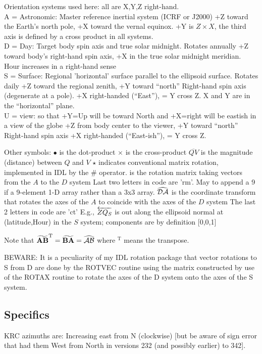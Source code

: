 \documentclass{article}
\begin{document}
\vspace{2.mm}
Orientation systems used here: all are X,Y,Z right-hand. 
\\ A = Astronomic: Master reference inertial system (ICRF or J2000) 
\qi  +Z toward the Earth's north pole, +X toward the vernal equinox.
\qii +Y is $Z \times  X $, the third axis is defined by a cross product in all systems. 
\\ D = Day: Target body spin axis and true solar midnight. Rotates annually
\qi +Z toward body's right-hand spin axis, +X in the true solar midnight meridian.
\qii Hour increases in a right-hand sense
\\ S = Surface: Regional 'horizontal' surface parallel to the ellipsoid surface. Rotates daily
\qi  +Z toward the regional zenith, +Y toward ``north'' Right-hand spin axis (degenerate at a pole).
\qii  +X right-handed (``East''), = Y cross Z. X and Y are in the ``horizontal'' plane.
\\ U = view: so that +Y=Up will be toward North and  +X=right will be eastish in a view of the globe
\qi +Z from body center to the viewer, +Y toward ``north'' Right-hand spin axis
\qi +X right-handed (``East-ish''), = Y cross Z.

\vspace{2.mm}
Other symbols:
\qi $\bullet$ is the dot-product 
\qi $\times$ is the cross-product 
\qi $\overline{QV}$ is the magnitude (distance) between $Q$ and $V$
\qi $\star$ indicates conventional matrix rotation, implemented in IDL by the \#
 operator.
\qi {} is the rotation matrix taking vectors from the $A$ to the $D$ system
\qii Last two letters in code are 'rm'. May to append a 9 if a 9-element 1-D array rather than a 3x3 array.
\qi  $\widehat {\mathcal{DA}}$ is the coordinate transform that rotates the axes of the $A$ to 
coincide with the axes of the $D$ system
\qii  The last 2 letters in code are 'ct'
\qi E.g., $\overleftarrow{ZQ_S}$ is out along the ellipsoid normal at (latitude,Hour) in the $S$ system;  components are by definition [0,0,1] 


Note that $\widetilde {\mathbf{ AB }}^\mathrm{T} = \widetilde {\mathbf{ BA }}  = \widehat {\mathcal{AB}} $
where $^\mathrm{T}$ means the transpose.

BEWARE: It is a peculiarity of my IDL rotation package that vector rotations to
S from D are done by the ROTVEC routine using the  matrix constructed by
use of the ROTAX routine to rotate the axes of the D system onto the axes of the
S system.


\subsection{Specifics \label{geos} }
KRC azimuths are: Increasing east from N (clockwise) [but be aware of sign
  error that had them West from North in versions 232 (and possibly earlier) to
  342].
\end{document}
